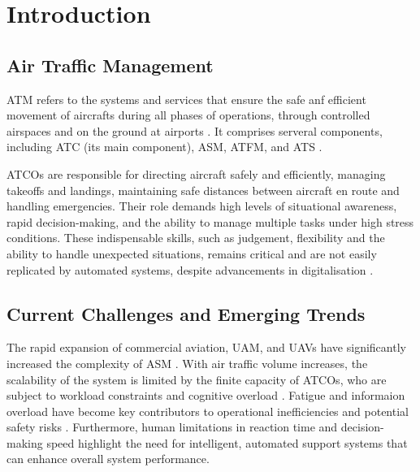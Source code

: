 \section{Introduction}

\subsection{Air Traffic Management}

\Gls{ATM} refers to the systems and services that ensure the safe anf efficient movement of aircrafts during all phases of operations, through controlled airspaces and on the ground at airports \cite{skybraryATM}. 
It comprises serveral components, including \gls{ATC} (its main component), \gls{ASM}, \gls{ATFM}, and \gls{ATS} \cite{Schuchardt_2023}.

\Glspl{ATCO} are responsible for directing aircraft safely and efficiently, managing takeoffs and landings, maintaining safe distances between aircraft en route and handling emergencies. 
Their role demands high levels of situational awareness, rapid decision-making, and the ability to manage multiple tasks under high stress conditions.
These indispensable skills, such as judgement, flexibility and the ability to handle unexpected situations, remains critical and are not easily replicated by automated systems, despite advancements in digitalisation \cite{eurocontrol2024digitalisation}.


\subsection{Current Challenges and Emerging Trends}

The rapid expansion of commercial aviation, \gls{UAM}, and \glspl{UAV} have significantly increased the complexity of \gls{ASM} \cite{Ramachandran_2025}.
With air traffic volume increases, the scalability of the system is limited by the finite capacity of \glspl{ATCO}, who are subject to workload constraints and cognitive overload \cite{Meier_2024}.
Fatigue and informaion overload  have become key contributors to operational inefficiencies and potential safety risks \cite{Ramachandran_2025}. 
Furthermore, human limitations in reaction time and decision-making speed highlight the need for intelligent, automated support systems that can enhance overall system performance.


